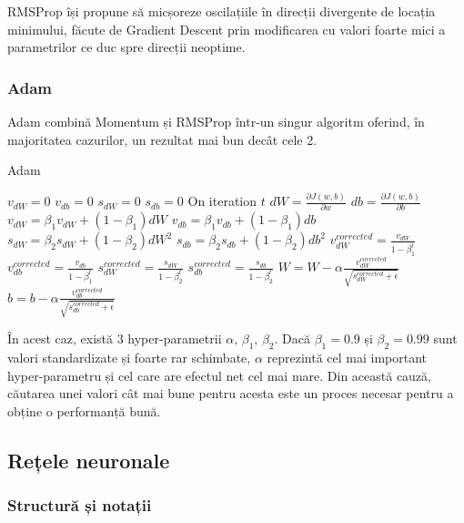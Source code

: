 RMSProp își propune să micșoreze oscilațiile în direcții divergente de locația minimului, făcute de Gradient Descent prin modificarea cu valori foarte mici a parametrilor ce duc spre direcții neoptime.

\subsubsection{Adam}

Adam combină Momentum și RMSProp într-un singur algoritm oferind, în majoritatea cazurilor, un rezultat mai bun decât cele 2.

\begin{algorithm}
\caption{Adam}
\begin{algorithmic}[4]
\State $v_{dW} = 0$
$v_{db} = 0$
$s_{dW} = 0$
$s_{db} = 0$
\State On iteration $t$
\State $dW = \frac{\partial J(w,b)}{\partial w}$
$db = \frac{\partial J(w,b)}{\partial b}$
\State $v_{dW} = \beta_1 v_{dW} + (1-\beta_1)dW$
$v_{db} = \beta_1 v_{db} + (1-\beta_1)db$
\State $s_{dW} = \beta_2 s_{dW} + (1-\beta_2)dW^2$
$s_{db} = \beta_2 s_{db} + (1-\beta_2)db^2$
\State $\displaystyle{v_{dW}^{corrected} = \frac{v_{dW}}{1 - \beta_1^t}}$
$\displaystyle{v_{db}^{corrected} = \frac{v_{db}}{1 - \beta_1^t}}$
\State $\displaystyle{s_{dW}^{corrected} = \frac{s_{dW}}{1 - \beta_2^t}}$
$\displaystyle{s_{db}^{corrected} = \frac{s_{db}}{1 - \beta_2^t}}$
\State $\displaystyle{W = W - \alpha \frac{v_{dW}^{corrected}}{\sqrt{s_{dW}^{corrected} + \epsilon}}}$
$\displaystyle{b = b - \alpha \frac{v_{db}^{corrected}}{\sqrt{s_{db}^{corrected} + \epsilon}}}$
\EndWhile
\end{algorithmic}
\end{algorithm} 

În acest caz, există 3 hyper-parametrii $\alpha, \, \beta_1, \, \beta_2$. Dacă $\beta_1=0.9$ și $\beta_2=0.99$ sunt valori standardizate și foarte rar schimbate, $\alpha$ reprezintă cel mai important hyper-parametru și cel care are efectul net cel mai mare. Din această cauză, căutarea unei valori cât mai bune pentru acesta este un proces necesar pentru a obține o performanță bună.

\subsection{Rețele neuronale}
\subsubsection{Structură și notații}

